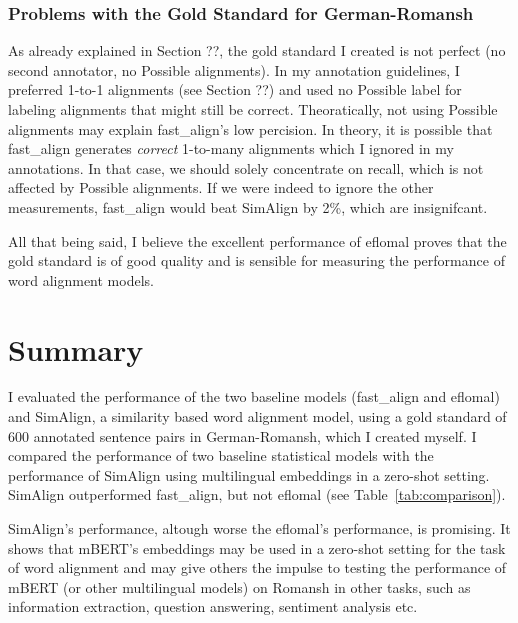 \subsubsection{Problems with the Gold Standard for German-Romansh}
As already explained in Section ??, the gold standard I created is not perfect (no second annotator, no Possible alignments). 
In my annotation guidelines, I preferred 1-to-1 alignments (see Section ??) and used no Possible label for labeling alignments that might still be correct.
Theoratically, not using Possible alignments may explain fast\_align's low percision. 
In theory, it is possible that fast\_align generates \emph{correct} 1-to-many alignments which I ignored in my annotations. 
In that case, we should solely concentrate on recall, which is not affected by Possible alignments. 
If we were indeed to ignore the other measurements, fast\_align would beat SimAlign by 2\%, which are insignifcant.

All that being said, I believe the excellent performance of eflomal proves that the gold standard is of good quality and is sensible for measuring the performance of word alignment models.

\section{Summary}
I evaluated the performance of the two baseline models (fast\_align and eflomal)  and SimAlign, a similarity based word alignment model, using a gold standard of 600 annotated sentence pairs in German-Romansh, which I created myself.
I compared the performance of two baseline statistical models with the performance of SimAlign using multilingual embeddings in a zero-shot setting. 
SimAlign outperformed fast\_align, but not eflomal (see Table~\ref{tab:comparison}). 

SimAlign's performance, altough worse the eflomal's performance, is promising. 
It shows that mBERT's embeddings may be used in a zero-shot setting for the task of word alignment and may give others the impulse to testing the performance of mBERT (or other multilingual models) on Romansh in other tasks, such as information extraction, question answering, sentiment analysis etc.




